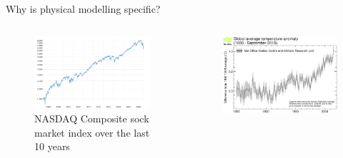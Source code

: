 \documentclass[handout]{beamer}
\begin{document}
\begin{frame}{Why is physical modelling specific?}

\begin{columns}


\begin{figure}
    \caption*{NASDAQ Composite sock market index over the last 10 years}
    \includegraphics[width=\textwidth]{fig/L1/nasdaq-composite-index-10-year-daily-chart-2019-01-09-macrotrends.png}
\end{figure}

\begin{figure}
    \includegraphics[width=\textwidth]{fig/L1/evolution-temperature.png}
\end{figure}

\end{columns}
    
\end{frame}
\end{document}
